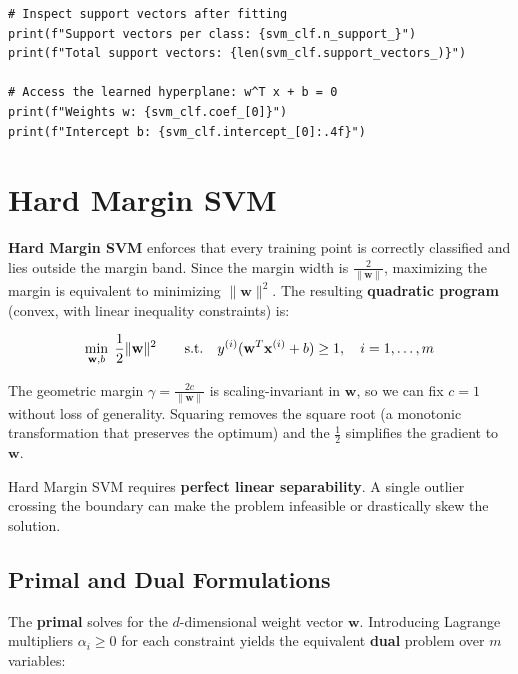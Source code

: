 \begin{lstlisting}[style=pythonstyle]
# Inspect support vectors after fitting
print(f"Support vectors per class: {svm_clf.n_support_}")
print(f"Total support vectors: {len(svm_clf.support_vectors_)}")

# Access the learned hyperplane: w^T x + b = 0
print(f"Weights w: {svm_clf.coef_[0]}")
print(f"Intercept b: {svm_clf.intercept_[0]:.4f}")
\end{lstlisting}

\section*{Hard Margin SVM}

\textbf{Hard Margin SVM} enforces that every training point is correctly classified and lies outside the margin band. Since the margin width is $\frac{2}{\|\mathbf{w}\|}$, maximizing the margin is equivalent to minimizing $\|\mathbf{w}\|^2$. The resulting \textbf{quadratic program} (convex, with linear inequality constraints) is:

$$\min_{\mathbf{w}, b} \;\frac{1}{2} \|\mathbf{w}\|^2 \qquad \text{s.t.} \quad y^{(i)}(\mathbf{w}^T\mathbf{x}^{(i)} + b) \geq 1, \quad i = 1, \ldots, m$$

\begin{remark}
The geometric margin $\gamma = \frac{2c}{\|\mathbf{w}\|}$ is scaling-invariant in $\mathbf{w}$, so we can fix $c = 1$ without loss of generality. Squaring removes the square root (a monotonic transformation that preserves the optimum) and the $\frac{1}{2}$ simplifies the gradient to $\mathbf{w}$.
\end{remark}

\begin{remark}
Hard Margin SVM requires \textbf{perfect linear separability}. A single outlier crossing the boundary can make the problem infeasible or drastically skew the solution.
\end{remark}

\subsection*{Primal and Dual Formulations}

The \textbf{primal} solves for the $d$-dimensional weight vector $\mathbf{w}$. Introducing Lagrange multipliers $\alpha_i \geq 0$ for each constraint yields the equivalent \textbf{dual} problem over $m$ variables:


